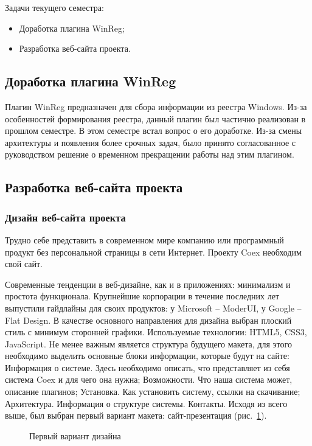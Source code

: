 Задачи текущего семестра:
\begin{itemize}
  \item Доработка плагина WinReg;
  \item Разработка веб-сайта проекта.
\end{itemize}
 
\subsection{ Доработка плагина WinReg }
 
Плагин WinReg предназначен для сбора информации из реестра Windows. Из-за особенностей формирования реестра, данный плагин был частично реализован в прошлом семестре. В этом семестре встал вопрос о его доработке. Из-за смены архитектуры и появления более срочных задач, было принято согласованное с руководством решение о временном прекращении работы над этим плагином.

\subsection{ Разработка веб-сайта проекта }

\subsubsection{ Дизайн веб-сайта проекта }

Трудно себе представить в современном мире компанию или программный продукт без персональной страницы в сети Интернет. Проекту Coex необходим свой сайт.

Современные тенденции в веб-дизайне, как и в приложениях: минимализм и простота функционала. Крупнейшие корпорации в течение последних лет выпустили гайдлайны для своих продуктов: у Microsoft – ModerUI, у Google – Flat Design.
В качестве основного направления для дизайна выбран плоский стиль с минимум сторонней графики. Используемые технологии: HTML5, CSS3, JavaScript.
Не менее важным является структура будущего макета, для этого необходимо выделить основные блоки информации, которые будут на сайте:
Информация о системе. Здесь необходимо описать, что представляет из себя система Coex и для чего она нужна;
Возможности. Что наша система может, описание плагинов;
Установка. Как установить систему, ссылки на скачивание;
Архитектура. Информация о структуре системы.
Контакты.
Исходя из всего выше, был выбран первый вариант макета: сайт-презентация (рис.~\ref{lo1:lo1}).

\begin{figure}[h!]
\center{\texttt{[image: lo1]}}
\caption{ Первый вариант дизайна }
\label{lo1:lo1}
\end{figure}

